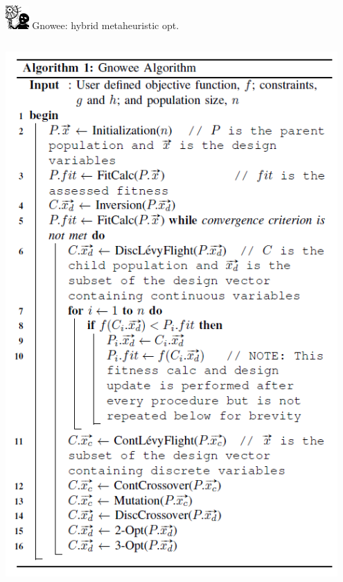 \documentclass[xcolor=x11names,compress,handout]{beamer}
\renewcommand{\(}{\begin{columns}}
\renewcommand{\)}{\end{columns}}
\newcommand{\<}[1]{\begin{column}{#1}}
\renewcommand{\>}{\end{column}}
\begin{document}
\begin{frame}{\includegraphics[width=0.35in]{../figs/Gnowee.png} \hspace{0.25cm}  Gnowee: hybrid metaheuristic opt.}
\begin{columns}
    \begin{column}{0.4\linewidth}
      \includegraphics[width=0.95\textwidth]{../figs/GnoweeAlgorithm.png}
    \end{column}
  \end{columns}
\end{frame}
\end{document}

